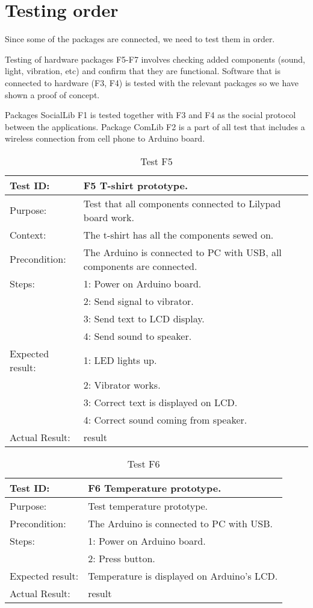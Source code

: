 \section{Testing order}
Since some of the packages are connected, we need to test them in order.

Testing of hardware packages F5-F7 involves checking added components (sound, light, vibration, etc)
and confirm that they are functional. Software that is connected to hardware (F3, F4) is tested
with the relevant packages so we have shown a proof of concept.

Packages SocialLib F1 is tested together with F3 and F4 as the social protocol between the applications.
Package ComLib F2 is a part of all test that includes a wireless connection from cell phone to Arduino board.

\begin{table}[h!]
\begin{tabular}{|l|p{10cm}|}
\hline Test ID: & F5 T-shirt prototype. \\ 
\hline Purpose: & Test that all components connected to Lilypad board work. \\ 
\hline Context: & The t-shirt has all the components sewed on. \\ 
\hline Precondition: & The Arduino is connected to PC with USB, all components are connected. \\ 
\hline
Steps:
  & 1: Power on Arduino board.\\ 
  & 2: Send signal to vibrator. \\ 
  & 3: Send text to LCD display. \\
  & 4: Send sound to speaker.\\
\hline
Expected result:
  & 1: LED lights up.\\ 
  & 2: Vibrator works. \\ 
  & 3: Correct text is displayed on LCD. \\ 
  & 4: Correct sound coming from speaker. \\
\hline
Actual Result:
  & result \\
\hline
\end{tabular}
\caption{Test F5}
\label{tbl:f5test}
\end{table}

\begin{table}[h!]
\begin{tabular}{|l|p{10cm}|}
\hline Test ID: & F6 Temperature prototype. \\ 
\hline Purpose: & Test temperature prototype. \\ 
\hline Precondition: & The Arduino is connected to PC with USB. \\ 
\hline
Steps:
  & 1: Power on Arduino board.\\ 
  & 2: Press button. \\ 
\hline
Expected result:
  & Temperature is displayed on Arduino's LCD.\\ 
\hline
Actual Result:
  & result \\
\hline
\end{tabular}
\caption{Test F6}
\label{tbl:f6test}
\end{table}

